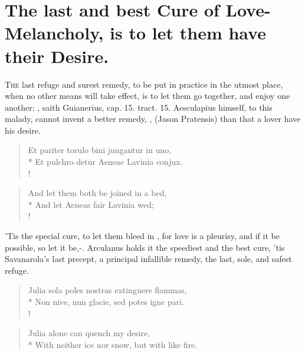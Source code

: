 \section[Let them have their Desire]{The last and best Cure of Love-Melancholy, is to let them have their Desire.}\label{sec:let-them-have-their-desire}

\lettrine{T}{he} last refuge and surest remedy, to be put in practice in the utmost
place, when no other means will take effect, is to let them go
together, and enjoy one another: , saith Guianerius, \textlatin{cap. 15. tract. 15}. Aesculapius himself, to
this malady, cannot invent a better remedy, , (Jason Pratensis) than that a lover have his desire.
%
\begin{latin}%
\begin{verse}%
Et pariter torulo bini jungantur in uno,\\*
Et pulchro detur Aeneae Lavinia conjux.\\!
\end{verse}%
\end{latin}%
\translationrule%
\begin{verse}
And let them both be joined in a bed,\\*
And let Aeneas fair Lavinia wed;\\!
\end{verse}
%
'Tis the special cure, to let them bleed in , for love is
a pleurisy, and if it be possible, so let it be,-. Arculanus holds it the speediest and the best cure, 'tis
Savanarola's last precept, a principal infallible remedy, the
last, sole, and safest refuge.
%
\begin{latin}%
\begin{verse}%
Julia sola poles nostras extinguere flammas,\\*
Non nive, nun glacie, sed potes igne pari.\\!
\end{verse}%
\end{latin}%
\translationrule
\begin{verse}
Julia alone can quench my desire,\\*
With neither ice nor snow, but with like fire.
\end{verse}
%

